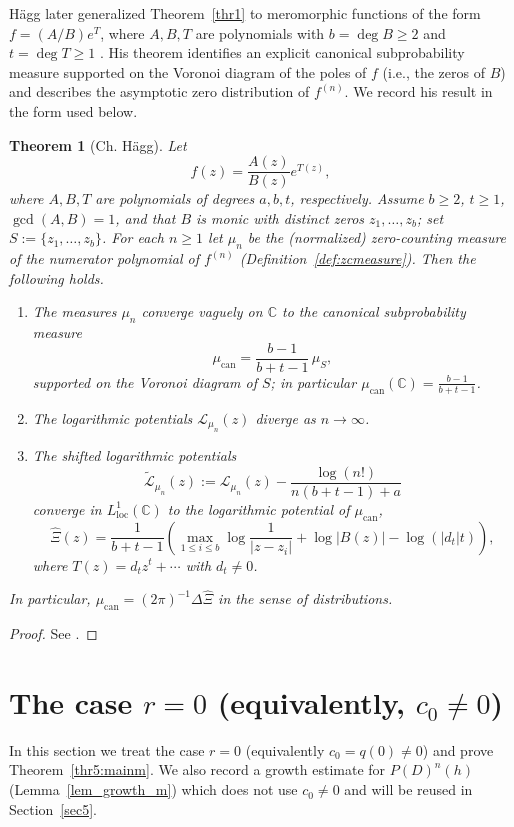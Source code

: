\documentclass[12pt]{article}
\theoremstyle{plain}
\newtheorem{theorem}{Theorem}
\theoremstyle{definition}
\begin{document}
H\"agg later generalized Theorem~\ref{thr1} to meromorphic functions of the form $f=(A/B)e^T$, where $A,B,T$ are polynomials with $b=\deg B\ge2$ and $t=\deg T\ge1$ \cite{Hagg}.
His theorem identifies an explicit canonical subprobability measure supported on the Voronoi diagram of the poles of $f$ (i.e., the zeros of $B$) and describes the asymptotic zero distribution of $f^{(n)}$.
We record his result in the form used below.
\begin{theorem}[Ch. H\"agg]\label{thr2}
Let
$$f(z)=\frac{A(z)}{B(z)}e^{T(z)},$$
where $A,B,T$ are polynomials of degrees $a,b,t$, respectively.
Assume $b\ge2$, $t\ge1$, $\gcd(A,B)=1$, and that $B$ is monic with distinct zeros $z_1,\ldots,z_b$; set $S:=\{z_1,\ldots,z_b\}$.
For each $n\ge1$ let $\mu_n$ be the (normalized) zero-counting measure of the numerator polynomial of $f^{(n)}$ (Definition~\ref{def:zcmeasure}).
Then the following holds.
\begin{enumerate}
	\item[(i)] The measures $\mu_n$ converge vaguely on $\mathbb C$ to the canonical subprobability measure
	$$\mu_{\mathrm{can}}=\frac{b-1}{b+t-1}\,\mu_S,$$
	supported on the Voronoi diagram of $S$; in particular $\mu_{\mathrm{can}}(\mathbb C)=\frac{b-1}{b+t-1}$.
	\item[(ii)] The logarithmic potentials $\mathcal L_{\mu_n}(z)$ diverge as $n\to\infty$.
	\item[(iii)] The shifted logarithmic potentials
	$$\tilde{\mathcal L}_{\mu_n}(z):=\mathcal L_{\mu_n}(z)-\frac{\log(n!)}{n(b+t-1)+a}$$
	converge in $L^{1}_{\mathrm{loc}}(\mathbb C)$ to the logarithmic potential of $\mu_{\mathrm{can}}$,
	$$\widehat{\Xi}(z)=\dfrac{1}{b+t-1}\left(\max_{1\le i\le b}\log\frac{1}{|z-z_i|}
		+\log \left|B(z)\right|-\log\left(\left|d_t\right|t\right)\right),$$
	where $T(z)=d_t z^t+\cdots$ with $d_t\neq0$.
\end{enumerate}
In particular, $\mu_{\mathrm{can}}=(2\pi)^{-1}\Delta \widehat{\Xi}$ in the sense of distributions.
\end{theorem}
\begin{proof}
See \cite{Hagg}.
\end{proof}

\section{The case $r=0$ (equivalently, $c_0\neq0$)}\label{sec4}

In this section we treat the case $r=0$ (equivalently $c_0=q(0)\neq0$) and prove Theorem~\ref{thr5:mainm}. We also record a growth estimate for $P(D)^n(h)$ (Lemma~\ref{lem_growth_m}) which does not use $c_0\neq0$ and will be reused in Section~\ref{sec5}.
\end{document}
